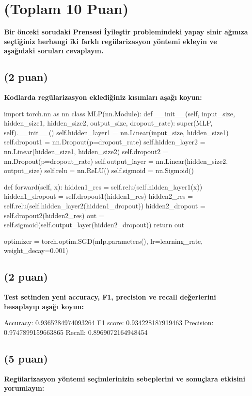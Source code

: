 \documentclass[11pt]{article}
\begin{document}
\section{(Toplam 10 Puan)} \textbf{Bir önceki sorudaki Prensesi İyileştir problemindeki yapay sinir ağınıza seçtiğiniz herhangi iki farklı regülarizasyon yöntemi ekleyin ve aşağıdaki soruları cevaplayın.} 

\subsection{(2 puan)} \textbf{Kodlarda regülarizasyon eklediğiniz kısımları aşağı koyun:} 

\begin{python}
import torch.nn as nn
class MLP(nn.Module):
    def __init__(self, input_size, hidden_size1, hidden_size2, output_size, dropout_rate):
        super(MLP, self).__init__()
        self.hidden_layer1 = nn.Linear(input_size, hidden_size1)
        self.dropout1 = nn.Dropout(p=dropout_rate)
        self.hidden_layer2 = nn.Linear(hidden_size1, hidden_size2)
        self.dropout2 = nn.Dropout(p=dropout_rate)
        self.output_layer = nn.Linear(hidden_size2, output_size)
        self.relu = nn.ReLU()
        self.sigmoid = nn.Sigmoid()

    def forward(self, x):
        hidden1_res = self.relu(self.hidden_layer1(x))
        hidden1_dropout = self.dropout1(hidden1_res)
        hidden2_res = self.relu(self.hidden_layer2(hidden1_dropout))
        hidden2_dropout = self.dropout2(hidden2_res)
        out = self.sigmoid(self.output_layer(hidden2_dropout))
        return out


optimizer = torch.optim.SGD(mlp.parameters(), lr=learning_rate, weight_decay=0.001)
\end{python}

\subsection{(2 puan)} \textbf{Test setinden yeni accuracy, F1, precision ve recall değerlerini hesaplayıp aşağı koyun:}

Accuracy: 0.9365284974093264
F1 score: 0.934228187919463
Precision: 0.9747899159663865
Recall: 0.8969072164948454


\subsection{(5 puan)} \textbf{Regülarizasyon yöntemi seçimlerinizin sebeplerini ve sonuçlara etkisini yorumlayın:}
\end{document}
